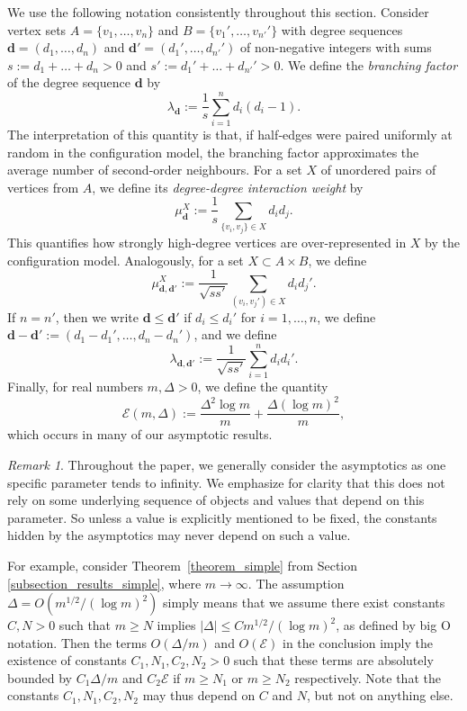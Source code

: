 \documentclass{article}
\theoremstyle{plain}
\theoremstyle{remark}
\newtheorem{remark}[theorem]{Remark}
\theoremstyle{plain}
\numberwithin{equation}{section}
\renewcommand{\d}{{\boldsymbol{d}}}
\begin{document}
	
	We use the following notation consistently throughout this section. Consider vertex sets $A=\{v_1,\ldots,v_n\}$ and $B=\{v_1',\ldots,v_{n'}'\}$ with degree sequences $\d=(d_1,\ldots,d_n)$ and $\d'=(d_1',\ldots,d_{n'}')$ of non-negative integers with sums $s:=d_1+\ldots+d_n>0$ and $s':=d_1'+\ldots+d_{n'}'>0$. We define the \emph{branching factor} of the degree sequence $\d$ by $$\lambda_{\d}:=\frac1s\sum_{i=1}^{n}d_i(d_i-1).$$ The interpretation of this quantity is that, if half‑edges were paired uniformly at random in the configuration model, the branching factor approximates the average number of second-order neighbours. For a set $X$ of unordered pairs of vertices from $A$, we define its \emph{degree-degree interaction weight} by $$\mu_{\d}^{X}:=\frac1s\sum_{\{v_i,v_j\}\in X}d_id_j.$$ This quantifies how strongly high‑degree vertices are over-represented in $X$ by the configuration model. Analogously, for a set $X\subset A\times B$, we define $$\mu_{\d,\d'}^{X}:=\frac1{\sqrt{ss'}}\sum_{(v_i,v_j')\in X}d_id_j'.$$ 
	If $n=n'$, then we write $\d\leq\d'$ if $d_i\leq d_i'$ for $i=1,\ldots,n$, we define $\d-\d':=(d_1-d_1',\ldots,d_n-d_n')$, and we define $$\lambda_{\d,\d'}:=\frac1{\sqrt{ss'}}\sum_{i=1}^{n}d_id_i'.$$ Finally, for real numbers $m,\Delta>0$, we define the quantity
	\begin{equation}\label{equation_script_e}
		\mathscr{E}(m,\Delta):=\frac{\Delta^2\log m}{m}+\frac{\Delta(\log m)^2}{m},
	\end{equation}
	which occurs in many of our asymptotic results.
	
	\begin{remark}\label{remark_asymptotics}
		Throughout the paper, we generally consider the asymptotics as one specific parameter tends to infinity. We emphasize for clarity that this does not rely on some underlying sequence of objects and values that depend on this parameter. So unless a value is explicitly mentioned to be fixed, the constants hidden by the asymptotics may never depend on such a value.
		
		For example, consider Theorem~\ref{theorem_simple} from Section \ref{subsection_results_simple}, where $m\to\infty$. The assumption $\Delta=O(m^{1/2}/(\log m)^2)$ simply means that we assume there exist constants $C,N>0$ such that $m\geq N$ implies $|\Delta|\leq Cm^{1/2}/(\log m)^2$, as defined by big O notation. Then the terms $O(\Delta/m)$ and $O(\mathscr{E})$ in the conclusion imply the existence of constants $C_1,N_1,C_2,N_2>0$ such that these terms are absolutely bounded by $C_1\Delta/m$ and $C_2\mathscr{E}$ if $m\geq N_1$ or $m\geq N_2$ respectively. Note that the constants $C_1,N_1,C_2,N_2$ may thus depend on $C$ and $N$, but not on anything else.
	\end{remark}
	
\end{document}
